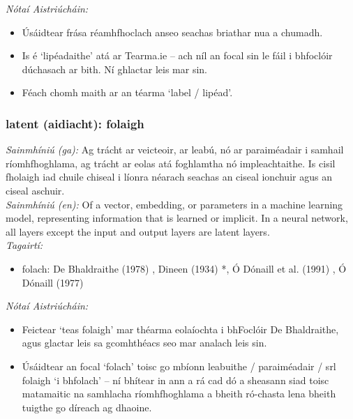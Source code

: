  \noindent \textit{Nótaí Aistriúcháin:}
\begin{itemize}
	\item Úsáidtear frása réamhfhoclach anseo seachas briathar nua a chumadh.
	\item Is é `lipéadaithe' atá ar Tearma.ie -- ach níl an focal sin le fáil i bhfoclóir dúchasach ar bith. Ní ghlactar leis mar sin.
	\item Féach chomh maith ar an téarma `label / lipéad'.
\end{itemize}


\subsubsection*{latent (aidiacht): folaigh}
 \noindent \textit{Sainmhíniú (ga):} Ag trácht ar veicteoir, ar leabú, nó ar paraiméadair i samhail ríomhfhoghlama, ag trácht ar eolas atá foghlamtha nó impleachtaithe. Is cisil fholaigh iad chuile chiseal i líonra néarach seachas an ciseal ionchuir agus an ciseal aschuir.
\\
 \noindent \textit{Sainmhíniú (en):} Of a vector, embedding, or parameters in a machine learning model, representing information that is learned or implicit. In a neural network, all layers except the input and output layers are latent layers.
\\
 \noindent \textit{Tagairtí:}
\begin{itemize}
	\item folach: De Bhaldraithe (1978) \cite{de-bhaldraithe}, Dineen (1934) \cite{dineen}*, Ó Dónaill et al. (1991) \cite{focloir-beag}, Ó Dónaill (1977) \cite{odonaill}
\end{itemize}

 \noindent \textit{Nótaí Aistriúcháin:}
\begin{itemize}
	\item Feictear `teas folaigh' mar théarma eolaíochta i bhFoclóir De Bhaldraithe, agus glactar leis sa gcomhthéacs seo mar analach leis sin.
	\item Úsáidtear an focal `folach' toisc go mbíonn leabuithe / paraiméadair / srl folaigh `i bhfolach' -- ní bhítear in ann a rá cad dó a sheasann siad toisc matamaitic na samhlacha ríomhfhoghlama a bheith ró-chasta lena bheith tuigthe go díreach ag dhaoine.
\end{itemize}


